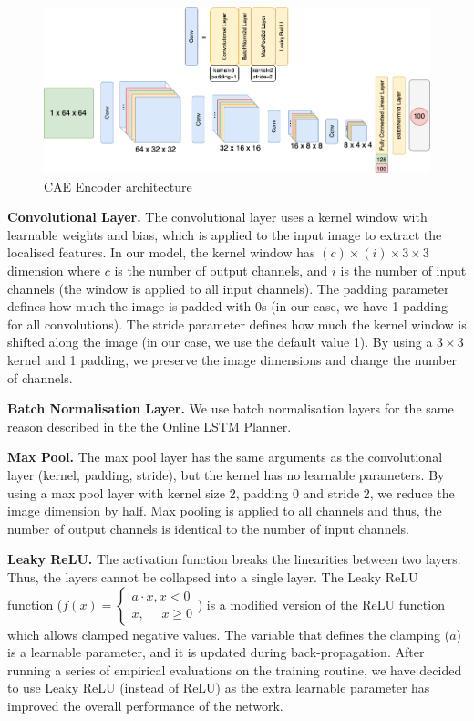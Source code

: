 \begin{figure}[h!]
    \centerfloat
    \includegraphics[scale=0.45]{images/caelstm_section_cae_kernel_encoder.png}
    \caption{CAE Encoder architecture}
    \label{fig:caelstm_section_cae_kernel_encoder}
\end{figure}

\textbf{Convolutional Layer.} The convolutional layer uses a kernel window with learnable weights and bias, which is applied to the input image to extract the localised features. In our model, the kernel window has $(c)\times(i)\times3\times3$ dimension where $c$ is the number of output channels, and $i$ is the number of input channels (the window is applied to all input channels). The padding parameter defines how much the image is padded with 0s (in our case, we have 1 padding for all convolutions). The stride parameter defines how much the kernel window is shifted along the image (in our case, we use the default value 1). By using a $3\times3$ kernel and 1 padding, we preserve the image dimensions and change the number of channels.

\textbf{Batch Normalisation Layer.} We use batch normalisation layers for the same reason described in the the Online LSTM Planner.

\textbf{Max Pool.} The max pool layer has the same arguments as the convolutional layer (kernel, padding, stride), but the kernel has no learnable parameters. By using a max pool layer with kernel size 2, padding 0 and stride 2, we reduce the image dimension by half. Max pooling is applied to all channels and thus, the number of output channels is identical to the number of input channels.

\textbf{Leaky ReLU.} The activation function breaks the linearities between two layers. Thus, the layers cannot be collapsed into a single layer. The Leaky ReLU function ($f(x) = \begin{cases} a \cdot x, x < 0 \\ x,\,\,\,\,\,\,\,\, x \geq 0 \end{cases}$) is a modified version of the ReLU function which allows clamped negative values. The variable that defines the clamping ($a$) is a learnable parameter, and it is updated during back-propagation. After running a series of empirical evaluations on the training routine, we have decided to use Leaky ReLU (instead of ReLU) as the extra learnable parameter has improved the overall performance of the network.

